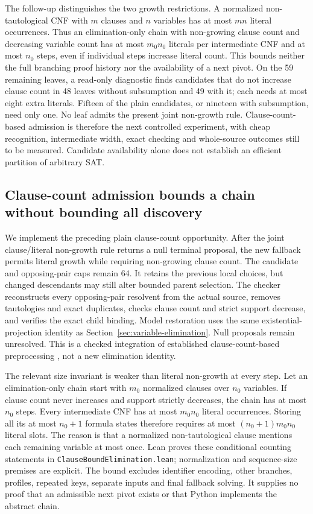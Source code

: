 \documentclass[11pt,a4paper]{article}
\numberwithin{equation}{section}
\theoremstyle{plain}
\theoremstyle{definition}
\theoremstyle{remark}
\begin{document}
The follow-up distinguishes the two growth restrictions. A normalized non-tautological CNF with $m$ clauses and $n$ variables has at most $mn$ literal occurrences. Thus an elimination-only chain with non-growing clause count and decreasing variable count has at most $m_0n_0$ literals per intermediate CNF and at most $n_0$ steps, even if individual steps increase literal count. This bounds neither the full branching proof history nor the availability of a next pivot. On the 59 remaining leaves, a read-only diagnostic finds candidates that do not increase clause count in 48 leaves without subsumption and 49 with it; each needs at most eight extra literals. Fifteen of the plain candidates, or nineteen with subsumption, need only one. No leaf admits the present joint non-growth rule. Clause-count-based admission is therefore the next controlled experiment, with cheap recognition, intermediate width, exact checking and whole-source outcomes still to be measured. Candidate availability alone does not establish an efficient partition of arbitrary SAT.

\subsection{Clause-count admission bounds a chain without bounding all discovery}
\label{sec:clause-bound-elimination}

We implement the preceding plain clause-count opportunity. After the joint clause/literal non-growth rule returns a null terminal proposal, the new fallback permits literal growth while requiring non-growing clause count. The candidate and opposing-pair caps remain 64. It retains the previous local choices, but changed descendants may still alter bounded parent selection. The checker reconstructs every opposing-pair resolvent from the actual source, removes tautologies and exact duplicates, checks clause count and strict support decrease, and verifies the exact child binding. Model restoration uses the same existential-projection identity as Section~\ref{sec:variable-elimination}. Null proposals remain unresolved. This is a checked integration of established clause-count-based preprocessing \citep{eenbiere2005}, not a new elimination identity.

The relevant size invariant is weaker than literal non-growth at every step. Let an elimination-only chain start with $m_0$ normalized clauses over $n_0$ variables. If clause count never increases and support strictly decreases, the chain has at most $n_0$ steps. Every intermediate CNF has at most $m_0n_0$ literal occurrences. Storing all its at most $n_0+1$ formula states therefore requires at most $(n_0+1)m_0n_0$ literal slots. The reason is that a normalized non-tautological clause mentions each remaining variable at most once. Lean proves these conditional counting statements in \texttt{ClauseBoundElimination.lean}; normalization and sequence-size premises are explicit. The bound excludes identifier encoding, other branches, profiles, repeated keys, separate inputs and final fallback solving. It supplies no proof that an admissible next pivot exists or that Python implements the abstract chain.
\end{document}
